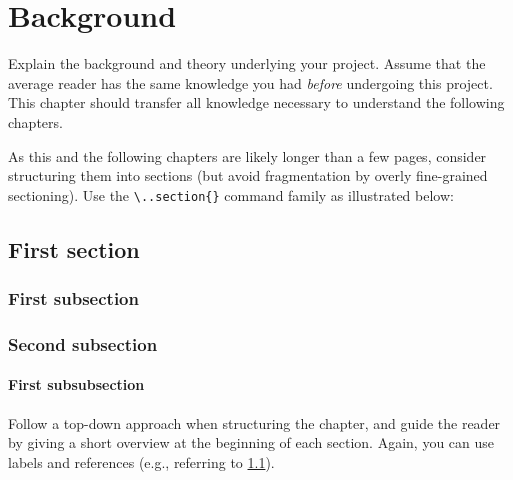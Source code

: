 \chapter{Background}
\label{ch:background}

Explain the background and theory underlying your project.
Assume that the average reader has the same knowledge you had \emph{before} undergoing this project.
This chapter should transfer all knowledge necessary to understand the following chapters.

As this and the following chapters are likely longer than a few pages, consider structuring them into sections (but avoid fragmentation by overly fine-grained sectioning).
Use the \verb|\..section{}| command family as illustrated below:

\section{First section}
\label{sec:background_overview}

\subsection{First subsection}

\subsection{Second subsection}

\subsubsection{First subsubsection}

Follow a top-down approach when structuring the chapter, and guide the reader by giving a short overview at the beginning of each section.
Again, you can use labels and references (e.g., referring to \cref{sec:background_overview}).
